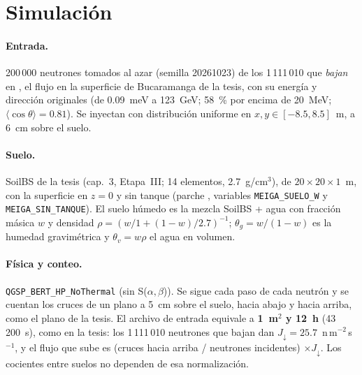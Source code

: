 \documentclass[11pt,a4paper]{article}
\begin{document}
\section{Simulación}
\paragraph{Entrada.} 200\,000 neutrones tomados al azar (semilla 20261023) de los 1\,111\,010 que \emph{bajan} en
, el flujo en la superficie de Bucaramanga de la tesis, con su energía y dirección
originales (de 0.09~meV a 123~GeV; 58~\% por encima de 20~MeV; $\langle\cos\theta\rangle = 0.81$). Se inyectan con
distribución uniforme en $x, y \in [-8.5, 8.5]$~m, a 6~cm sobre el suelo.

\paragraph{Suelo.} SoilBS de la tesis (cap.~3, Etapa~III; 14 elementos, 2.7~g/cm$^3$), de $20\times20\times1$~m,
con la superficie en $z=0$ y sin tanque (parche , variables \texttt{MEIGA\_SUELO\_W} y
\texttt{MEIGA\_SIN\_TANQUE}). El suelo húmedo es la mezcla SoilBS + agua con fracción másica $w$ y densidad
$\rho = (w/1 + (1-w)/2.7)^{-1}$; $\theta_g = w/(1-w)$ es la humedad gravimétrica y $\theta_v = w\rho$ el agua en volumen.

\paragraph{Física y conteo.} \texttt{QGSP\_BERT\_HP\_NoThermal} (sin S($\alpha,\beta$)). Se sigue cada paso de cada
neutrón y se cuentan los cruces de un plano a 5~cm sobre el suelo, hacia abajo y hacia arriba, como el plano de la
tesis. El archivo de entrada equivale a \textbf{1~m$^2$ y 12~h} (43\,200~s), como en la tesis: los 1\,111\,010
neutrones que bajan dan $J_\downarrow = 25.7$~n\,m$^{-2}$\,s$^{-1}$, y el flujo que sube es (cruces hacia arriba /
neutrones incidentes) $\times J_\downarrow$. Los cocientes entre suelos no dependen de esa normalización.
\end{document}
